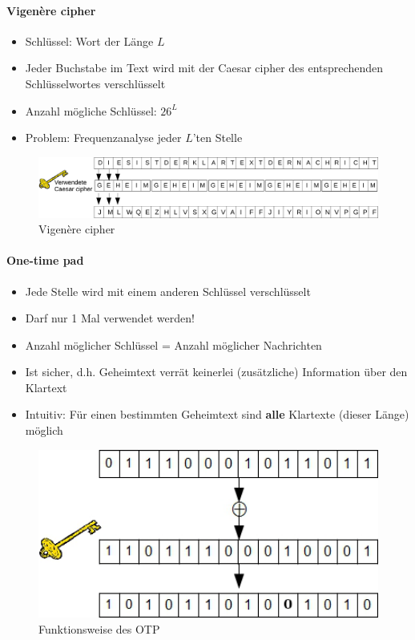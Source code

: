 \documentclass[10pt,a4paper]{article}
\begin{document}
\paragraph*{Vigenère cipher}\label{para:Vigenère cipher}
\begin{itemize}[noitemsep,topsep=0pt,leftmargin=*]
    \item Schlüssel: Wort der Länge $L$
    \item Jeder Buchstabe im Text wird mit der Caesar cipher des entsprechenden Schlüsselwortes verschlüsselt
    \item Anzahl mögliche Schlüssel: $26^L$
    \item Problem: Frequenzanalyse jeder $L$'ten Stelle
\end{itemize}
\begin{figure}[H]
    \begin{center}
    \includegraphics[width=16cm]{images/vigenere.png}
    \caption{Vigenère cipher}
    \label{vigenere}
    \end{center}
\end{figure}

\paragraph*{One-time pad}
\begin{itemize}[noitemsep,topsep=0pt,leftmargin=*]
    \item Jede Stelle wird mit einem anderen Schlüssel verschlüsselt
    \item Darf nur 1 Mal verwendet werden!
    \item Anzahl möglicher Schlüssel = Anzahl möglicher Nachrichten
    \item Ist sicher, d.h. Geheimtext verrät keinerlei (zusätzliche) Information über den Klartext
    \item Intuitiv: Für einen bestimmten Geheimtext sind \textbf{alle} Klartexte (dieser Länge) möglich
\end{itemize}
\begin{figure}[H]
    \begin{center}
    \includegraphics[width=12cm]{images/otp.png}
    \caption{Funktionsweise des OTP}
    \label{otp}
    \end{center}
\end{figure}
\end{document}
